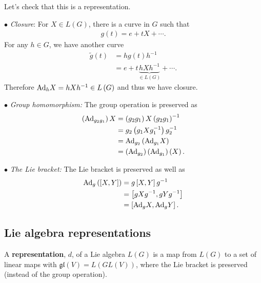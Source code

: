 Let's check that this is a representation.

    $\bullet$ \textit{Closure}: For $X \in L \left( G \right) $, there is a curve in $G$ such that
    \begin{align}
        g \left( t \right) = e + t X + \cdots
    .\end{align}
    For any $h \in G$, we have another curve
    \begin{align}
        \widetilde{g}\left( t \right) &= h g\left( t \right) h^{-1} \\
        &= e + t\underbrace{h X h^{-1}}_{\in L \left( G \right) } + \cdots
    .\end{align}
    Therefore $\text{Ad}_h X = h X h^{-1} \in L \left( G \right) $ and thus we have closure.

    $\bullet$ \textit{Group homomorphism:} The group operation is preserved as 
    \begin{align}
        \left( \text{Ad}_{g_2 g_1} \right)  X &= \left( g_2 g_1 \right) X \left( g_2 g_1 \right)^{-1} \\
        &= g_2 \left( g_1 X g_1^{-1} \right) g_2^{-1} \\
        &= \text{Ad}_{g_2} \left( \text{Ad}_{g_1}X \right)  \\
        &= \left( \text{Ad}_{g_2} \right) \left( \text{Ad}_{g_1} \right) \left( X \right) 
    .\end{align}

    $\bullet$ \textit{The Lie bracket:} The Lie bracket is preserved as well as
    \begin{align}
        \text{Ad}_g \left( \left[ X,Y \right]  \right) &= g \left[ X,Y \right] g^{-1} \\
        &= \left[ g X g^{-1}, gYg^{-1} \right]  \\
        &= \left[ \text{Ad}_g X, \text{Ad}_g Y \right]
    .\end{align}

\subsection{Lie algebra representations}

\begin{definition}
    A \textbf{representation}, $d$, of a Lie algebra $L \left( G \right) $ is a map from $L \left( G \right) $ to a set of linear maps with $\mathfrak{gl}\left( V \right) = L \left( GL \left( V \right)  \right)$, where the Lie bracket is preserved (instead of the group operation).
\end{definition}


